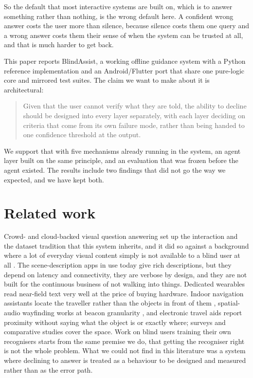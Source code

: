 \documentclass[sigconf,nonacm]{acmart}
\begin{document}
So the default that most interactive systems are built on, which is to answer
something rather than nothing, is the wrong default here. A confident wrong
answer costs the user more than silence, because silence costs them one query
and a wrong answer costs them their sense of when the system can be trusted at
all, and that is much harder to get back.

This paper reports BlindAssist, a working offline guidance system with a Python
reference implementation and an Android/Flutter port that share one pure-logic
core and mirrored test suites. The claim we want to make about it is
architectural:

\begin{quote}
Given that the user cannot verify what they are told, the ability to decline
should be designed into every layer separately, with each layer deciding on
criteria that come from its own failure mode, rather than being handed to one
confidence threshold at the output.
\end{quote}

We support that with five mechanisms already running in the system, an agent
layer built on the same principle, and an evaluation that was frozen before the
agent existed. The results include two findings that did not go the way we
expected, and we have kept both.

\section{Related work}

Crowd- and cloud-backed visual question answering set up the interaction
\cite{bigham2010vizwiz} and the dataset tradition \cite{gurari2018vizwiz} that
this system inherits, and it did so against a background where a lot of
everyday visual content simply is not available to a blind user at all
\cite{morris2016twitter}. The scene-description apps in use today
\cite{bemyeyes,seeingai,envision,lookout} give rich descriptions, but they
depend on latency and connectivity, they are verbose by design, and they are not
built for the continuous business of not walking into things. Dedicated
wearables \cite{orcam} read near-field text very well at the price of buying
hardware. Indoor navigation assistants locate the traveller rather than the
objects in front of them \cite{ahmetovic2016navcog,sato2017navcog3,guerreiro2019cabot},
spatial-audio wayfinding works at beacon granularity \cite{soundscape}, and
electronic travel aids \cite{wewalk} report proximity without saying what the
object is or exactly where; surveys \cite{kuriakose2022review} and comparative
studies \cite{zhao2020wayfinding} cover the space. Work on blind users training
their own recognisers \cite{kacorri2017teachable} starts from the same premise
we do, that getting the recogniser right is not the whole problem. What we could
not find in this literature was a system where declining to answer is treated as
a behaviour to be designed and measured rather than as the error path.
\end{document}
